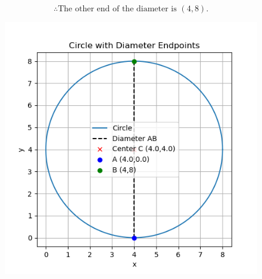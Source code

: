 \documentclass[journal]{IEEEtran}
\begin{document}
\[ \therefore \text{The other end of the diameter is }(4,8). \]

\begin{figure}[H]
    \centering
    \includegraphics[width=0.5\linewidth]{figs/Figure_1.png}
    \label{fig:circle}
\end{figure}
\end{document}

